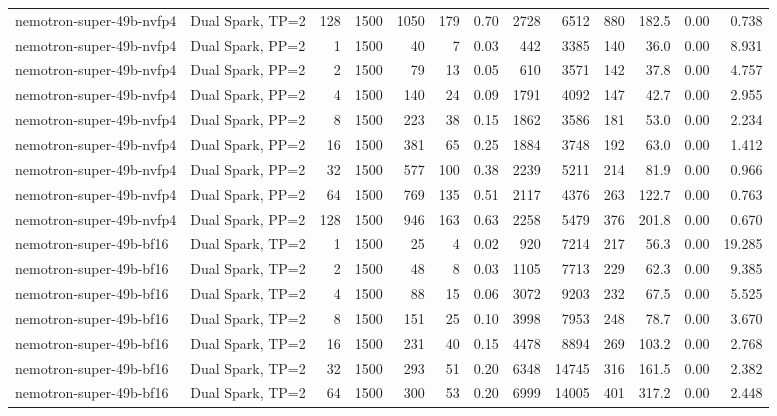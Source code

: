 \begin{tabular}{l l r r r r r r r r r r r}
nemotron-super-49b-nvfp4 & Dual Spark, TP=2 & 128 & 1500 & 1050 & 179 & 0.70 & 2728 & 6512 & 880 & 182.5 & 0.00 & 0.738 \\
\addlinespace
nemotron-super-49b-nvfp4 & Dual Spark, PP=2 & 1 & 1500 & 40\rlap{$^\dagger$} & 7 & 0.03 & 442 & 3385 & 140 & 36.0 & 0.00 & 8.931 \\
nemotron-super-49b-nvfp4 & Dual Spark, PP=2 & 2 & 1500 & 79\rlap{$^\dagger$} & 13 & 0.05 & 610 & 3571 & 142 & 37.8 & 0.00 & 4.757 \\
nemotron-super-49b-nvfp4 & Dual Spark, PP=2 & 4 & 1500 & 140 & 24 & 0.09 & 1791 & 4092 & 147 & 42.7 & 0.00 & 2.955 \\
nemotron-super-49b-nvfp4 & Dual Spark, PP=2 & 8 & 1500 & 223 & 38 & 0.15 & 1862 & 3586 & 181 & 53.0 & 0.00 & 2.234 \\
nemotron-super-49b-nvfp4 & Dual Spark, PP=2 & 16 & 1500 & 381 & 65 & 0.25 & 1884 & 3748 & 192 & 63.0 & 0.00 & 1.412 \\
nemotron-super-49b-nvfp4 & Dual Spark, PP=2 & 32 & 1500 & 577 & 100 & 0.38 & 2239 & 5211 & 214 & 81.9 & 0.00 & 0.966 \\
nemotron-super-49b-nvfp4 & Dual Spark, PP=2 & 64 & 1500 & 769 & 135 & 0.51 & 2117 & 4376 & 263 & 122.7 & 0.00 & 0.763 \\
nemotron-super-49b-nvfp4 & Dual Spark, PP=2 & 128 & 1500 & 946 & 163 & 0.63 & 2258 & 5479 & 376 & 201.8 & 0.00 & 0.670 \\
\addlinespace
nemotron-super-49b-bf16 & Dual Spark, TP=2 & 1 & 1500 & 25\rlap{$^\dagger$} & 4 & 0.02 & 920 & 7214 & 217 & 56.3 & 0.00 & 19.285 \\
nemotron-super-49b-bf16 & Dual Spark, TP=2 & 2 & 1500 & 48\rlap{$^\dagger$} & 8 & 0.03 & 1105 & 7713 & 229 & 62.3 & 0.00 & 9.385 \\
nemotron-super-49b-bf16 & Dual Spark, TP=2 & 4 & 1500 & 88\rlap{$^\dagger$} & 15 & 0.06 & 3072 & 9203 & 232 & 67.5 & 0.00 & 5.525 \\
nemotron-super-49b-bf16 & Dual Spark, TP=2 & 8 & 1500 & 151 & 25 & 0.10 & 3998 & 7953 & 248 & 78.7 & 0.00 & 3.670 \\
nemotron-super-49b-bf16 & Dual Spark, TP=2 & 16 & 1500 & 231 & 40 & 0.15 & 4478 & 8894 & 269 & 103.2 & 0.00 & 2.768 \\
nemotron-super-49b-bf16 & Dual Spark, TP=2 & 32 & 1500 & 293 & 51 & 0.20 & 6348 & 14745 & 316 & 161.5 & 0.00 & 2.382 \\
nemotron-super-49b-bf16 & Dual Spark, TP=2 & 64 & 1500 & 300 & 53 & 0.20 & 6999 & 14005 & 401 & 317.2 & 0.00 & 2.448 \\

\end{tabular}
